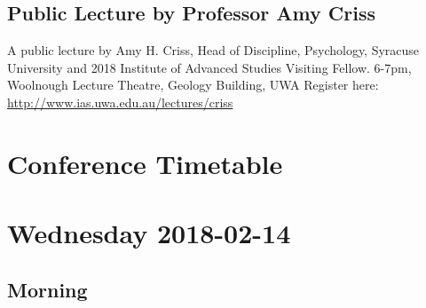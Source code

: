\documentclass[]{article}
\begin{document}
\subsection{Public Lecture by Professor Amy
Criss}\label{public-lecture-by-professor-amy-criss}

A public lecture by Amy H. Criss, Head of Discipline, Psychology,
Syracuse University and 2018 Institute of Advanced Studies Visiting
Fellow. 6-7pm, Woolnough Lecture Theatre, Geology Building, UWA Register
here: \url{http://www.ias.uwa.edu.au/lectures/criss}

\newpage

\section{Conference Timetable}\label{conference-timetable}

\renewcommand{\arraystretch}{1.5}







\section{Wednesday 2018-02-14}\label{wednesday-2018-02-14}

\subsection{Morning}\label{morning}
\end{document}
